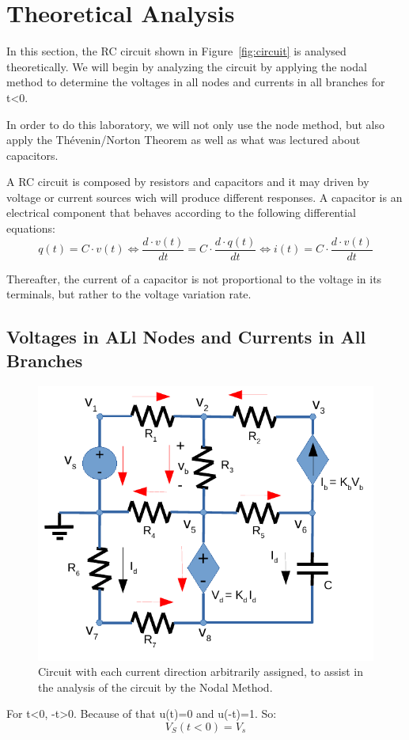 \section{Theoretical Analysis}
\label{sec:analysis}
In this section, the RC circuit shown in Figure~\ref{fig:circuit} is analysed
theoretically. We will begin by analyzing the circuit by applying the nodal method to determine the voltages in all nodes and currents in all branches for t\textless 0.

In order to do this laboratory, we will not only use the node method, but also apply the Thévenin/Norton Theorem as well as what was lectured about capacitors.

A RC circuit is composed by resistors and capacitors and it may driven by voltage or current sources wich will produce different responses.
A capacitor is an electrical component that behaves according to the following differential equations:
\begin{equation}
  q(t)=C\cdot v(t)\Leftrightarrow \frac{d\cdot v(t)}{dt} = C\cdot \frac{d\cdot q(t)}{dt}\Leftrightarrow i(t)=C\cdot \frac{d\cdot v(t)}{dt}
\end{equation}

Thereafter, the current of a capacitor is not proportional to the voltage in its terminals, but rather to the voltage variation rate.

\subsection{Voltages in ALl Nodes and Currents in All Branches}

\begin{figure}[H] \centering
\includegraphics[width=0.4\linewidth]{mcurrents.pdf}
\caption{Circuit with each current direction arbitrarily assigned, to assist in the analysis of the circuit by the Nodal Method.}
\label{fig:nvoltages}
\end{figure}

For t\textless 0, -t\textgreater 0. Because of that u(t)=0 and u(-t)=1. So:
\begin{equation}
  V_S(t<0)=V_s
\end{equation}

